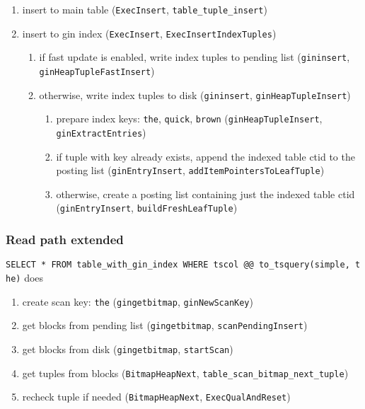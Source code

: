 \documentclass[11pt]{article}
\providecommand{\tightlist}{%
  \setlength{\itemsep}{0pt}\setlength{\parskip}{0pt}}
\begin{document}
\begin{enumerate}
\def\labelenumi{\arabic{enumi}.}
\tightlist
\item
  insert to main table (\texttt{ExecInsert},
  \texttt{table\_tuple\_insert})
\item
  insert to gin index (\texttt{ExecInsert},
  \texttt{ExecInsertIndexTuples})

  \begin{enumerate}
  \def\labelenumii{\arabic{enumii}.}
  \tightlist
  \item
    if fast update is enabled, write index tuples to pending list
    (\texttt{gininsert}, \texttt{ginHeapTupleFastInsert})
  \item
    otherwise, write index tuples to disk (\texttt{gininsert},
    \texttt{ginHeapTupleInsert})

    \begin{enumerate}
    \def\labelenumiii{\arabic{enumiii}.}
    \tightlist
    \item
      prepare index keys: \texttt{the}, \texttt{quick}, \texttt{brown}
      (\texttt{ginHeapTupleInsert}, \texttt{ginExtractEntries})
    \item
      if tuple with key already exists, append the indexed table ctid to
      the posting list (\texttt{ginEntryInsert},
      \texttt{addItemPointersToLeafTuple})
    \item
      otherwise, create a posting list containing just the indexed table
      ctid (\texttt{ginEntryInsert}, \texttt{buildFreshLeafTuple})
    \end{enumerate}
  \end{enumerate}
\end{enumerate}

\hypertarget{read-path-extended}{%
\subsubsection{Read path extended}\label{read-path-extended}}

\texttt{SELECT\ *\ FROM\ table\_with\_gin\_index\ WHERE\ tscol\ @@\ to\_tsquery(\textquotesingle{}simple\textquotesingle{},\ \textquotesingle{}the\textquotesingle{})}
does

\begin{enumerate}
\def\labelenumi{\arabic{enumi}.}
\tightlist
\item
  create scan key: \texttt{the} (\texttt{gingetbitmap},
  \texttt{ginNewScanKey})
\item
  get blocks from pending list (\texttt{gingetbitmap},
  \texttt{scanPendingInsert})
\item
  get blocks from disk (\texttt{gingetbitmap}, \texttt{startScan})
\item
  get tuples from blocks (\texttt{BitmapHeapNext},
  \texttt{table\_scan\_bitmap\_next\_tuple})
\item
  recheck tuple if needed (\texttt{BitmapHeapNext},
  \texttt{ExecQualAndReset})
\end{enumerate}
\end{document}

